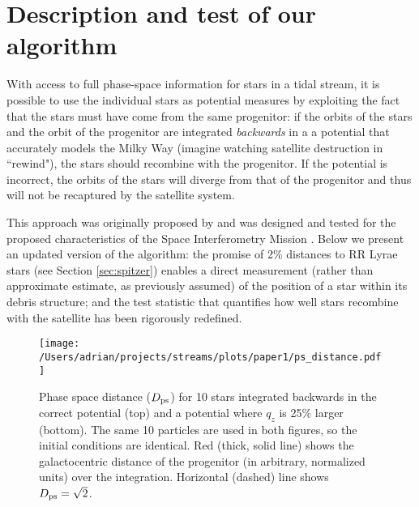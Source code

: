 \documentclass{emulateapj}
\begin{document}
\section{Description and test of our algorithm}
\label{sec:method}
With access to full phase-space information for stars in a tidal
stream, it is possible to use the individual stars as potential
measures by exploiting the fact that the stars must have come from the
same progenitor: if the orbits of the stars and the
orbit of the progenitor are integrated \emph{backwards} in a a potential that accurately models the Milky Way
(imagine watching satellite destruction in ``rewind"), the stars
should recombine with the progenitor. If the potential is incorrect,
the orbits of the stars will diverge from that of the progenitor and
thus will not be recaptured by the satellite system.


This approach was originally proposed by \citet{johnston99a} and was
designed and tested for the proposed characteristics of the Space
Interferometry Mission \citep{unwin08}. Below we present an updated version of the algorithm:
the promise of 2\% distances to RR Lyrae stars (see Section
\ref{sec:spitzer}) enables a direct measurement (rather than
approximate estimate, as previously assumed) of the position of a star within its debris
structure; and the test statistic that quantifies how well stars recombine
with the satellite has been rigorously redefined.

\begin{figure}[h]
\begin{center}
\texttt{[image: /Users/adrian/projects/streams/plots/paper1/ps\_distance.pdf]}
\caption{Phase space distance ($D_{\rm ps}$) for 10 stars integrated backwards in the correct potential (top) and a potential where $q_z$ is 25\% larger (bottom). The same 10 particles are used in both figures, so the initial conditions are identical. Red (thick, solid line) shows the galactocentric distance of the progenitor (in arbitrary, normalized units) over the integration. Horizontal (dashed) line shows $D_{\rm ps}=\sqrt{2}$.}\label{fig:ps_distance}
\end{center}
\end{figure}
\end{document}
